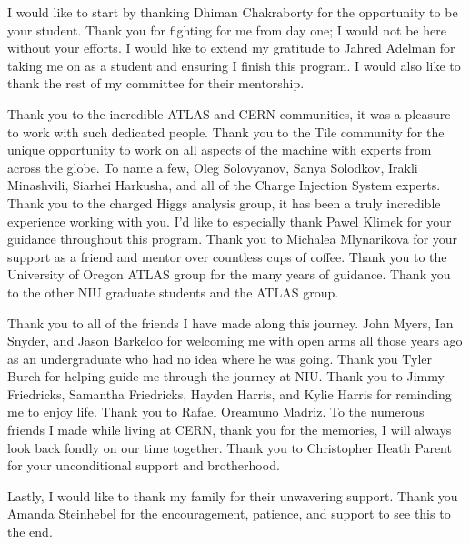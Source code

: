I would like to start by thanking Dhiman Chakraborty for the opportunity to be your student. Thank you for fighting for me from day one; I would not be here without your efforts. I would like to extend my gratitude to Jahred Adelman for taking me on as a student and ensuring I finish this program. I would also like to thank the rest of my committee for their mentorship. 

Thank you to the incredible ATLAS and CERN communities, it was a pleasure to work with such dedicated people. Thank you to the Tile community for the unique opportunity to work on all aspects of the machine with experts from across the globe. To name a few, Oleg Solovyanov, Sanya Solodkov, Irakli Minashvili, Siarhei Harkusha, and all of the Charge Injection System experts. Thank you to the charged Higgs analysis group, it has been a truly incredible experience working with you. I'd like to especially thank Pawel Klimek for your guidance throughout this program. Thank you to Michalea Mlynarikova for your support as a friend and mentor over countless cups of coffee. Thank you to the University of Oregon ATLAS group for the many years of guidance. Thank you to the other NIU graduate students and the ATLAS group.

Thank you to all of the friends I have made along this journey. John Myers, Ian Snyder, and Jason Barkeloo for welcoming me with open arms all those years ago as an undergraduate who had no idea where he was going. Thank you Tyler Burch for helping guide me through the journey at NIU. Thank you to Jimmy Friedricks, Samantha Friedricks, Hayden Harris, and Kylie Harris for reminding me to enjoy life. Thank you to Rafael Oreamuno Madriz. To the numerous friends I made while living at CERN, thank you for the memories, I will always look back fondly on our time together. Thank you to Christopher Heath Parent for your unconditional support and brotherhood.

Lastly, I would like to thank my family for their unwavering support. Thank you Amanda Steinhebel for the encouragement, patience, and support to see this to the end.